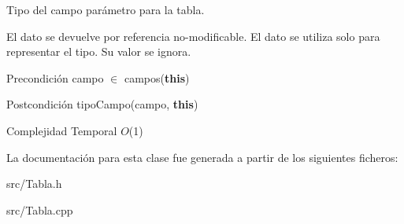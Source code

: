Tipo del campo parámetro para la tabla. 

El dato se devuelve por referencia no-\/modificable. El dato se utiliza solo para representar el tipo. Su valor se ignora.

\begin{DoxyPrecond}{Precondición}
campo $\in$ campos({\bfseries this}) 
\end{DoxyPrecond}
\begin{DoxyPostcond}{Postcondición}
tipo\+Campo(campo, {\bfseries this})
\end{DoxyPostcond}

\begin{DoxyDescription}
\item[Complejidad Temporal]$O$(1)
\end{DoxyDescription}

La documentación para esta clase fue generada a partir de los siguientes ficheros\+:\begin{DoxyCompactItemize}
\item 
src/Tabla.\+h\item 
src/Tabla.\+cpp\end{DoxyCompactItemize}
